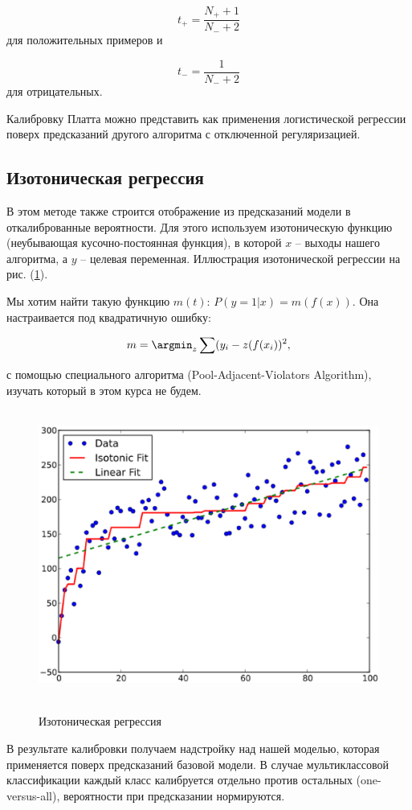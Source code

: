 \documentclass[12pt,a4paper]{article}
\begin{document}
$$t_{+} = \frac{N_{+} + 1}{N_{-} + 2}$$ для положительных примеров и

$$t_{-} = \frac{1}{N_{-} + 2}$$ для отрицательных.

Калибровку Платта можно представить как применения логистической регрессии поверх предсказаний другого алгоритма с отключенной регуляризацией.


\subsection{Изотоническая регрессия}

В этом методе также строится отображение из предсказаний модели в откалиброванные вероятности. Для этого используем изотоническую функцию (неубывающая кусочно-постоянная функция), в которой $x$ -- выходы нашего алгоритма, а $y$ -- целевая переменная. Иллюстрация изотонической регрессии на рис. (\ref{fig:isotonic}).

Мы хотим найти такую функцию $m(t)$: $P(y = 1 | x) = m(f(x))$. Она настраивается под квадратичную ошибку:

$$m = \argmin_{z} \sum (y_i - z(f(x_i))^2,$$

с помощью специального алгоритма (Pool-Adjacent-Violators Algorithm), изучать который в этом курса не будем.

\begin{center}
\begin{figure}[!htb]
 \centering
 \includegraphics[width=0.7\linewidth]{img/isotonic.eps}
 \caption{Изотоническая регрессия}\label{fig:isotonic}
\end{figure}
\end{center}


В результате калибровки получаем надстройку над нашей моделью, которая применяется поверх предсказаний базовой модели. В случае мультиклассовой классификации каждый класс калибруется отдельно против остальных (one-versus-all), вероятности при предсказании нормируются.
\end{document}
